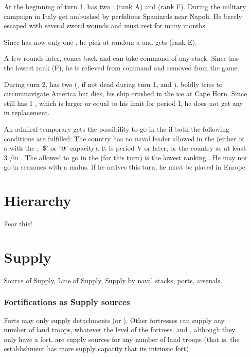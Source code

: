 \begin{exemple}
  At the beginning of turn 1, \FRA has two \LeaderG :  (rank A)
  and  (rank F). During the military campaign in Italy 
  get ambushed by perfidious Spaniards near Napoli. He barely escaped with
  several sword wounds and must rest for many months.

  Since \FRA has now only one \LeaderG, he pick at random a \anonyme\LeaderG
  and gets  (rank E).

  A few rounds later,  comes back and can take command of any
  stack. Since  has the lowest rank (F), he is relieved from command
  and removed from the game.

  \smallskip

  During turn 2, \POR has two \LeaderE (, if not dead during turn
  1, and ).  boldly tries to circumnavigate
  America but dies, his ship crushed in the ice at Cape Horn. Since \POR still
  has 1 \LeaderE, which is larger or equal to his limit for period I, he does
  not get any \anonyme\LeaderE in replacement.
\end{exemple}

An admiral temporary gets the possibility to go in the  if
both the following conditions are fulfilled:
\bparag The country has no naval leader allowed in the \ROTW (either \LeaderE
or a \LeaderA with the \ROTW, '\$' or '@' capacity).
\bparag It is period V or later, or the country as at least 3 \COL/\TP in
.
\bparag The \LeaderA allowed to go in the  (for this turn) is
the lowest ranking \LeaderA. He may not go in seazones with a malus. If he
arrives this turn, he must be placed in Europe.

\section{Hierarchy}
Fear this!

\section{Supply}
Source of Supply, Line of Supply, Supply by naval stacks, ports, arsenals.

\subsubsection{Fortifications as Supply sources}
\bparag Forts may only supply detachments (\LD or \LDE).
\bparag Other fortresses can supply any number of land troops, whatever the
level of the fortress.
\bparag \COL and \TP, although they only have a fort, are supply sources for
any number of land troops (that is, the establishment has more supply capacity
that its intrinsic fort).

